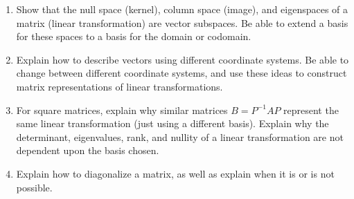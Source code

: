 
\begin{enumerate}

\item Show that the null space (kernel), column space (image), and eigenspaces of a matrix (linear transformation) are vector subspaces. Be able to extend a basis for these spaces to a basis for the domain or codomain.
\item Explain how to describe vectors using different coordinate systems. Be able to change between different coordinate systems, and use these ideas to construct matrix representations of linear transformations.
\item For square matrices, explain why similar matrices $B=P^{-1}AP$ represent the same linear transformation (just using a different basis). Explain why the determinant, eigenvalues, rank, and nullity of a linear transformation are not dependent upon the basis chosen.
\item Explain how to diagonalize a matrix, as well as explain when it is or is not possible. 


\end{enumerate}

